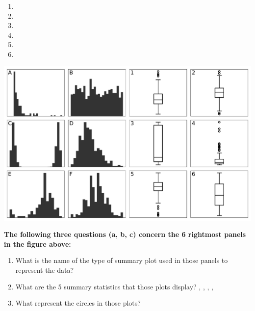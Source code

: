 \documentclass[11pt]{exam}
\begin{document}
\begin{questions}


\begin{minipage}[l]{0.15\textwidth}
  \begin{enumerate}
 		\item \makebox[0.3in]{\hrulefill}
 		\item \makebox[0.3in]{\hrulefill}
 		\item \makebox[0.3in]{\hrulefill}
 		\item \makebox[0.3in]{\hrulefill}
 		\item \makebox[0.3in]{\hrulefill}
 		\item \makebox[0.3in]{\hrulefill}
	\end{enumerate}
\end{minipage}
\hfill
\begin{minipage}[r]{0.8\textwidth}
	\includegraphics[width=\textwidth]{../figs/fig0.pdf}
\end{minipage}

{\bf The following three questions (a, b, c) concern the 6 rightmost panels in the figure above:}
\begin{enumerate}[label=\alph*.]
	\item What is the name of the type of summary plot used in those panels to represent the data? \makebox[1in]{\hrulefill}
	\item What are the 5 summary statistics that those plots display? \makebox[1in]{\hrulefill}, \makebox[1in]{\hrulefill}, \makebox[1in]{\hrulefill}, \makebox[1in]{\hrulefill}, \makebox[1in]{\hrulefill}
	\item What represent the circles in those plots? \makebox[1in]{\hrulefill}
\end{enumerate}
\vspace{2em}



\end{questions}
\end{document}
